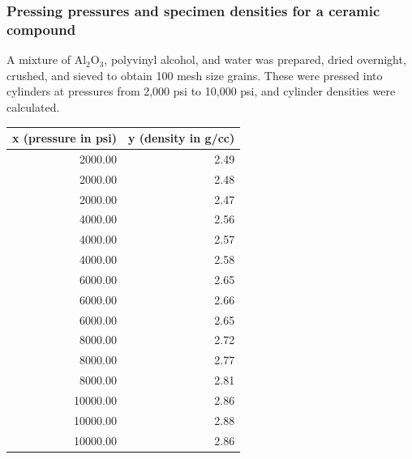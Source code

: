 \documentclass[handout]{beamer}\usepackage[]{graphicx}\usepackage[]{color}
\numberwithin{equation}{section}
\begin{document}
\begin{frame}[fragile]
\frametitle{\small Pressing pressures and specimen densities for a ceramic compound}
\scriptsize
A mixture of $\text{Al}_2\text{O}_3$, polyvinyl alcohol, and water was prepared, dried overnight, crushed, and sieved to obtain 100 mesh size grains. These were pressed into cylinders at pressures from 2,000 psi to 10,000 psi, and cylinder densities were calculated. 

\begin{table}[ht]
\centering
\begin{tabular}{rr}
 x (pressure in psi) & y (density in g/cc) \\ 
  \hline
2000.00 & 2.49 \\ 
  2000.00 & 2.48 \\ 
  2000.00 & 2.47 \\ 
  4000.00 & 2.56 \\ 
  4000.00 & 2.57 \\ 
  4000.00 & 2.58 \\ 
  6000.00 & 2.65 \\ 
  6000.00 & 2.66 \\ 
  6000.00 & 2.65 \\ 
  8000.00 & 2.72 \\ 
  8000.00 & 2.77 \\ 
  8000.00 & 2.81 \\ 
  10000.00 & 2.86 \\ 
  10000.00 & 2.88 \\ 
  10000.00 & 2.86 \\ 
  \end{tabular}
\end{table}


\end{frame}
\end{document}
